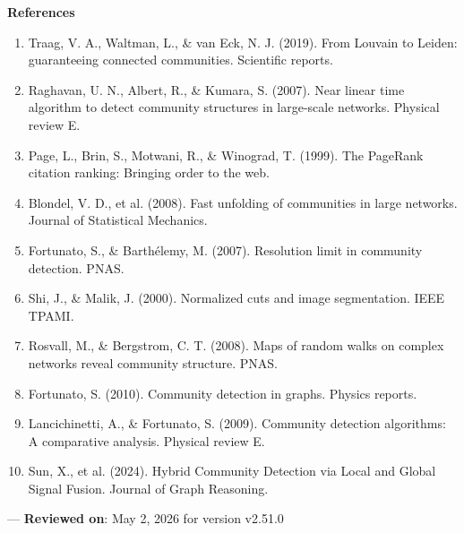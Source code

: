 \textbf{References}
\begin{enumerate}
\item Traag, V. A., Waltman, L., \& van Eck, N. J. (2019). From Louvain to Leiden: guara\-nteeing connected communities. Scientific reports.
\item Raghavan, U. N., Albert, R., \& Kumara, S. (2007). Near linear time algorithm to detect community structures in large-scale networks. Physical review E.
\item Page, L., Brin, S., Motwani, R., \& Winograd, T. (1999). The PageRank citation ranking: Bringing order to the web.
\item Blondel, V. D., et al. (2008). Fast unfolding of communities in large networks. Journal of Statistical Mechanics.
\item Fortunato, S., \& Barthélemy, M. (2007). Resolution limit in community detection. PNAS.
\item Shi, J., \& Malik, J. (2000). Normalized cuts and image segme\-ntation. IEEE TPAMI.
\item Rosvall, M., \& Bergstrom, C. T. (2008). Maps of random walks on complex networks reveal community structure. PNAS.
\item Fortunato, S. (2010). Community detection in graphs. Physics reports.
\item Lancic\-hinetti, A., \& Fortunato, S. (2009). Community detection algorithms: A comparative analysis. Physical review E.
\item Sun, X., et al. (2024). Hybrid Community Detection via Local and Global Signal Fusion. Journal of Graph Reasoning.

\end{enumerate}
---
\textbf{Reviewed on}: May 2, 2026 for version v2.51.0
